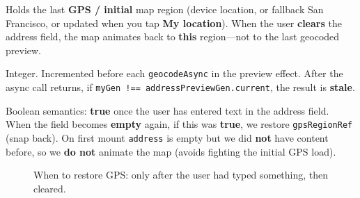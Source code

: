 \documentclass[11pt,a4paper]{article}
\begin{document}
\begin{description}[style=nextline, leftmargin=1.5cm]
    \item[\texttt{gpsRegionRef}] Holds the last \textbf{GPS / initial} map region (device location, or fallback San Francisco, or updated when you tap \textbf{My location}). When the user \textbf{clears} the address field, the map animates back to \textbf{this} region---not to the last geocoded preview.

    \item[\texttt{addressPreviewGen}] Integer. Incremented before each \texttt{geocodeAsync} in the preview effect. After the async call returns, if \texttt{myGen !== addressPreviewGen.current}, the result is \textbf{stale}.

    \item[\texttt{hadAddressContentRef}] Boolean semantics: \textbf{true} once the user has entered text in the address field. When the field becomes \textbf{empty} again, if this was \textbf{true}, we restore \texttt{gpsRegionRef} (snap back). On first mount \texttt{address} is empty but we did \textbf{not} have content before, so we \textbf{do not} animate the map (avoids fighting the initial GPS load).

\end{description}

\begin{figure}[h]
\centering
{}
\caption{When to restore GPS: only after the user had typed something, then cleared.}
\end{figure}

\end{document}
